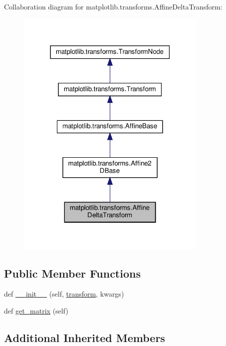 Collaboration diagram for matplotlib.\+transforms.\+Affine\+Delta\+Transform\+:
\nopagebreak
\begin{figure}[H]
\begin{center}
\leavevmode
\includegraphics[width=259pt]{classmatplotlib_1_1transforms_1_1AffineDeltaTransform__coll__graph}
\end{center}
\end{figure}
\subsection*{Public Member Functions}
\begin{DoxyCompactItemize}
\item 
def \hyperlink{classmatplotlib_1_1transforms_1_1AffineDeltaTransform_aa90fe30a403d3b4373add206fddd04a2}{\+\_\+\+\_\+init\+\_\+\+\_\+} (self, \hyperlink{classmatplotlib_1_1transforms_1_1AffineBase_a610b1a5dbb9222a2a5f1f1f17fd342c2}{transform}, kwargs)
\item 
def \hyperlink{classmatplotlib_1_1transforms_1_1AffineDeltaTransform_a67ba5f532151dbc082d9b3eea098e5a3}{get\+\_\+matrix} (self)
\end{DoxyCompactItemize}
\subsection*{Additional Inherited Members}


